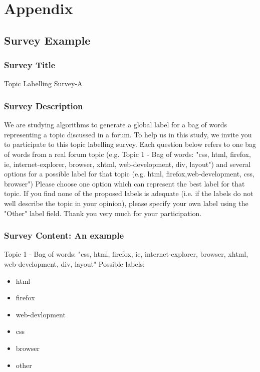 \chapter{Appendix}
\label{chap:appendix}

\section{Survey Example}

\subsection{Survey Title}
Topic Labelling Survey-A
\subsection{Survey Description}
We are studying algorithms to generate a global label for a bag of words representing a topic discussed in a forum.
To help us in this study, we invite you to participate to this topic labelling survey.
Each question below refers to one bag of words from a real forum topic (e.g. Topic 1 - Bag of words: "css, html, firefox, ie, internet-explorer, browser, xhtml, web-development, div, layout") and several options for a possible label for that topic (e.g. html, firefox,web-development, css, browser")
Please choose one option which can represent the best label for that topic.
If you find none of the proposed labels is adequate (i.e. if the labels do not well describe the topic in your opinion), please specify your own label using the "Other" label field.
Thank you very much for your participation.
\subsection{Survey Content: An example}
Topic 1 - Bag of words: "css, html, firefox, ie, internet-explorer, browser, xhtml, web-development, div, layout" Possible labels: 
\begin{itemize}
    \item html
    \item firefox
    \item web-devlopment
    \item css
    \item browser
    \item other
\end{itemize}

